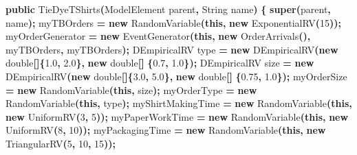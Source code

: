 \documentclass[
]{book}
\newenvironment{Shaded}{\begin{snugshade}}{\end{snugshade}}
\newcommand{\BuiltInTok}[1]{#1}
\newcommand{\DataTypeTok}[1]{\textcolor[rgb]{0.13,0.29,0.53}{#1}}
\newcommand{\DecValTok}[1]{\textcolor[rgb]{0.00,0.00,0.81}{#1}}
\newcommand{\FloatTok}[1]{\textcolor[rgb]{0.00,0.00,0.81}{#1}}
\newcommand{\FunctionTok}[1]{\textcolor[rgb]{0.00,0.00,0.00}{#1}}
\newcommand{\KeywordTok}[1]{\textcolor[rgb]{0.13,0.29,0.53}{\textbf{#1}}}
\newcommand{\NormalTok}[1]{#1}
\newcommand{\OperatorTok}[1]{\textcolor[rgb]{0.81,0.36,0.00}{\textbf{#1}}}
\theoremstyle{definition}
\theoremstyle{definition}
\theoremstyle{definition}
\theoremstyle{definition}
\theoremstyle{remark}
\begin{document}
\begin{Shaded}
\begin{Highlighting}[]
    \KeywordTok{public} \FunctionTok{TieDyeTShirts}\OperatorTok{(}\NormalTok{ModelElement parent}\OperatorTok{,} \BuiltInTok{String}\NormalTok{ name}\OperatorTok{)} \OperatorTok{\{}
        \KeywordTok{super}\OperatorTok{(}\NormalTok{parent}\OperatorTok{,}\NormalTok{ name}\OperatorTok{);}
\NormalTok{        myTBOrders }\OperatorTok{=} \KeywordTok{new} \FunctionTok{RandomVariable}\OperatorTok{(}\KeywordTok{this}\OperatorTok{,} \KeywordTok{new} \FunctionTok{ExponentialRV}\OperatorTok{(}\DecValTok{15}\OperatorTok{));}
\NormalTok{        myOrderGenerator }\OperatorTok{=} \KeywordTok{new} \FunctionTok{EventGenerator}\OperatorTok{(}\KeywordTok{this}\OperatorTok{,} \KeywordTok{new} \FunctionTok{OrderArrivals}\OperatorTok{(),}
\NormalTok{                myTBOrders}\OperatorTok{,}\NormalTok{ myTBOrders}\OperatorTok{);}
\NormalTok{        DEmpiricalRV type }\OperatorTok{=} \KeywordTok{new} \FunctionTok{DEmpiricalRV}\OperatorTok{(}\KeywordTok{new} \DataTypeTok{double}\OperatorTok{[]\{}\FloatTok{1.0}\OperatorTok{,} \FloatTok{2.0}\OperatorTok{\},} \KeywordTok{new} \DataTypeTok{double}\OperatorTok{[]} \OperatorTok{\{}\FloatTok{0.7}\OperatorTok{,} \FloatTok{1.0}\OperatorTok{\});}
\NormalTok{        DEmpiricalRV size }\OperatorTok{=} \KeywordTok{new} \FunctionTok{DEmpiricalRV}\OperatorTok{(}\KeywordTok{new} \DataTypeTok{double}\OperatorTok{[]\{}\FloatTok{3.0}\OperatorTok{,} \FloatTok{5.0}\OperatorTok{\},} \KeywordTok{new} \DataTypeTok{double}\OperatorTok{[]} \OperatorTok{\{}\FloatTok{0.75}\OperatorTok{,} \FloatTok{1.0}\OperatorTok{\});}
\NormalTok{        myOrderSize }\OperatorTok{=} \KeywordTok{new} \FunctionTok{RandomVariable}\OperatorTok{(}\KeywordTok{this}\OperatorTok{,}\NormalTok{ size}\OperatorTok{);}
\NormalTok{        myOrderType }\OperatorTok{=} \KeywordTok{new} \FunctionTok{RandomVariable}\OperatorTok{(}\KeywordTok{this}\OperatorTok{,}\NormalTok{ type}\OperatorTok{);}
\NormalTok{        myShirtMakingTime }\OperatorTok{=} \KeywordTok{new} \FunctionTok{RandomVariable}\OperatorTok{(}\KeywordTok{this}\OperatorTok{,} \KeywordTok{new} \FunctionTok{UniformRV}\OperatorTok{(}\DecValTok{3}\OperatorTok{,} \DecValTok{5}\OperatorTok{));}
\NormalTok{        myPaperWorkTime }\OperatorTok{=} \KeywordTok{new} \FunctionTok{RandomVariable}\OperatorTok{(}\KeywordTok{this}\OperatorTok{,} \KeywordTok{new} \FunctionTok{UniformRV}\OperatorTok{(}\DecValTok{8}\OperatorTok{,} \DecValTok{10}\OperatorTok{));}
\NormalTok{        myPackagingTime }\OperatorTok{=} \KeywordTok{new} \FunctionTok{RandomVariable}\OperatorTok{(}\KeywordTok{this}\OperatorTok{,} \KeywordTok{new} \FunctionTok{TriangularRV}\OperatorTok{(}\DecValTok{5}\OperatorTok{,} \DecValTok{10}\OperatorTok{,} \DecValTok{15}\OperatorTok{));}

\end{Highlighting}
\end{Shaded}
\end{document}
